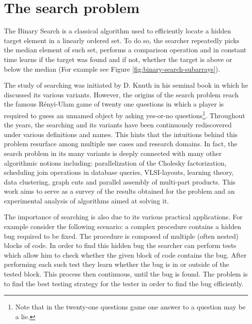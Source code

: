 \section{The search problem}
The Binary Search is a classical algorithm used to efficiently locate a hidden target element in a linearly ordered set. To do so, the searcher repeatedly picks the median element of such set, performs a comparison operation and in constant time learns if the target was found and if not, whether the target is above or below the median (For example see Figure \ref{fig:binary-search-subarrays}).



The study of searching was initiated by D. Knuth in his seminal book \cite{Knuth1973} in which he discussed its various variants. However, the origins of the search problem reach the famous Rényi-Ulam game of twenty one questions in which a player is required to guess an unnamed object by asking yes-or-no questions\footnote{Note that in the twenty-one questions game one answer to a question may be a lie.}. Throughout the years, the searching and its variants have been continuously rediscovered under various definitions and names. This hints that the intuitions behind this problem resurface among multiple use cases and research domains. In fact, the search problem in its many variants is deeply connected with many other algorithmic notions including: parallelization of the Cholesky factorization, scheduling join operations in database queries, VLSI-layouts, learning theory, data clustering, graph cuts and parallel assembly of multi-part products. This work aims to serve as a survey of the results obtained for the problem and an experimental analysis of algorithms aimed at solving it.

The importance of searching is also due to its various practical applications. For example consider the following scenario: a complex procedure contains a hidden bug required to be fixed. The procedure is composed of multiple (often nested) blocks of code. In order to find this hidden bug the searcher can perform tests which allow him to check whether the given block of code contains the bug. After performing each such test they learn whether the bug is in or outside of the tested block. This process then continuous, until the bug is found. The problem is to find the best testing strategy for the tester in order to find the bug efficiently.

